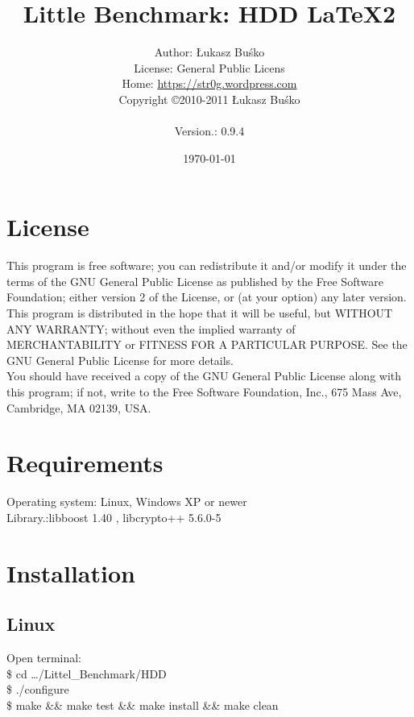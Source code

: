 \documentclass[a4paper]{article}
\begin{document}
\title{Little Benchmark: HDD  \LaTeX2}
\author{Author: Łukasz Buśko
\\License: General Public Licens
\\Home:  \href{https://str0g.wordpress.com}{https://str0g.wordpress.com}
\\Copyright \copyright 2010-2011 Łukasz Buśko\\
\date{\today} Version.: 0.9.4}
\maketitle
\newpage
\tableofcontents
\newpage
\section{License}

    This program is free software; you can redistribute it and/or modify
    it under the terms of the GNU General Public License as published by
    the Free Software Foundation; either version 2 of the License, or
    (at your option) any later version.\\

    This program is distributed in the hope that it will be useful,
    but WITHOUT ANY WARRANTY; without even the implied warranty of
    MERCHANTABILITY or FITNESS FOR A PARTICULAR PURPOSE.  See the
    GNU General Public License for more details.\\

    You should have received a copy of the GNU General Public License
    along with this program; if not, write to the Free Software
    Foundation, Inc., 675 Mass Ave, Cambridge, MA 02139, USA.
    
\section{Requirements}
Operating system: Linux, Windows XP or newer\\
Library.:libboost 1.40 , libcrypto++ 5.6.0-5
\section{Installation}
\subsection{Linux}
Open terminal:\\
\$ cd \ldots/Littel\_Benchmark/HDD\\
\$ ./configure\\
\$ make \&\& make test \&\& make install \&\& make clean\\
\end{document}
